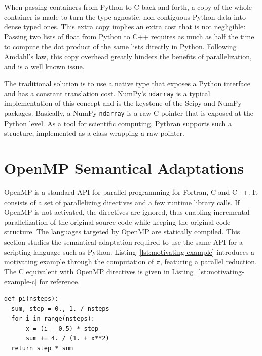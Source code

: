 \documentclass[conference]{IEEEtran}
\begin{document}
When passing containers from Python to C back and forth, a copy of the whole
container is made to turn the type agnostic, non-contiguous Python data into
dense typed ones. This extra copy implies an extra cost that is not negligible:
Passing two lists of float from Python to C++ requires as much as half the time
to compute the dot product of the same lists directly in Python. Following
Amdahl's law, this copy overhead greatly hinders the benefits of
parallelization, and is a well known issue.

The traditional solution is to use a native type that exposes a Python interface
and has a constant translation cost. NumPy's \texttt{ndarray} is a typical
implementation of this concept and is the keystone of the Scipy and NumPy
packages. Basically, a NumPy \texttt{ndarray} is a raw C pointer that is exposed
at the Python level. As a tool for scientific computing, Pythran supports such a
structure, implemented as a class wrapping a raw pointer.


\section{OpenMP Semantical Adaptations}\label{sec:python-openmp}

OpenMP is a standard API for parallel programming for Fortran, C and C++. It
consists of a set of parallelizing directives and a few runtime library calls.
If OpenMP is not activated, the directives are ignored, thus enabling
incremental parallelization of the original source code while keeping the
original code structure. The languages targeted by OpenMP are statically
compiled. This section studies the semantical adaptation required to use the
same API for a scripting language such as Python.
Listing~\ref{lst:motivating-example} introduces a motivating example through the
computation of $\pi$, featuring a parallel reduction. The C equivalent with
OpenMP directives is given in Listing~\ref{lst:motivating-example-c} for
reference.

\begin{lstlisting}[float, label={lst:motivating-example}, caption={Motivating
example: computing $\pi$ in Python.}]
def pi(nsteps):
  sum, step = 0., 1. / nsteps
  for i in range(nsteps):
      x = (i - 0.5) * step
      sum += 4. / (1. + x**2)
  return step * sum
\end{lstlisting}
\end{document}
